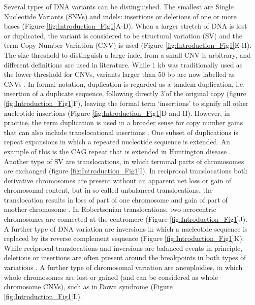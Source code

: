 Several types of DNA variants can be distinguished. The smallest are Single Nucleotide Variants (SNVs) and indels: insertions or deletions of one or more bases (Figure \ref{fig:Introduction_Fig1}A-D). 
When a larger stretch of DNA is lost or duplicated, the variant is considered to be structural variation (SV) and the term Copy Number Variation (CNV) is used (Figure \ref{fig:Introduction_Fig1}E-H). 
The size threshold to distinguish a large indel from a small CNV is arbitrary, and different definitions are used in literature. While 1 kb was traditionally used as the lower threshold for CNVs, variants larger than 50 bp are now labelled as CNVs \cite{Redon_2006,Tan_2014,Wilfert_2017}. 
In formal notation, duplication is regarded as a tandem duplication, i.e. insertion of a duplicate sequence, following directly 3’of the original copy (figure \ref{fig:Introduction_Fig1}F), leaving the formal term ‘insertions’ to signify all other nucleotide insertions \cite{den_Dunnen_2016} (Figure \ref{fig:Introduction_Fig1}D and H). 
However, in practice, the term duplication is used in a broader sense for copy number gains that can also include translocational insertions \cite{Kang_2010,Hanemaaijer_2012}. 
One subset of duplications is repeat expansions in which a repeated nucleotide sequence is extended. 
An example of this is the CAG repeat that is extended in Huntington disease \cite{Rubinsztein_1996}. 
Another type of SV are translocations, in which terminal parts of chromosomes are exchanged (figure \ref{fig:Introduction_Fig1}I). 
In reciprocal translocations both derivative chromosomes are present without an apparent net loss or gain of chromosomal content, but in so-called unbalanced translocations, the translocation results in loss of part of one chromosome and gain of part of another chromosome \cite{Maithripala_2017}. 
In Robertsonian translocations, two acrocentric chromosomes are connected at the centromere \cite{Robertson_1916} (Figure \ref{fig:Introduction_Fig1}J). 
A further type of DNA variation are inversions in which a nucleotide sequence is replaced by its reverse complement sequence \cite{Sudmant_2015,den_Dunnen_2016} (Figure \ref{fig:Introduction_Fig1}K). 
While reciprocal translocations and inversions are balanced events in principle, deletions or insertions are often present around the breakpoints in both types of variations \cite{Sudmant_2015,Simioni_2017}. 
A further type of chromosomal variation are aneuploidies, in which whole chromosomes are lost or gained (and can be considered as whole chromosome CNVs), such as in Down syndrome (Figure \ref{fig:Introduction_Fig1}L).  


